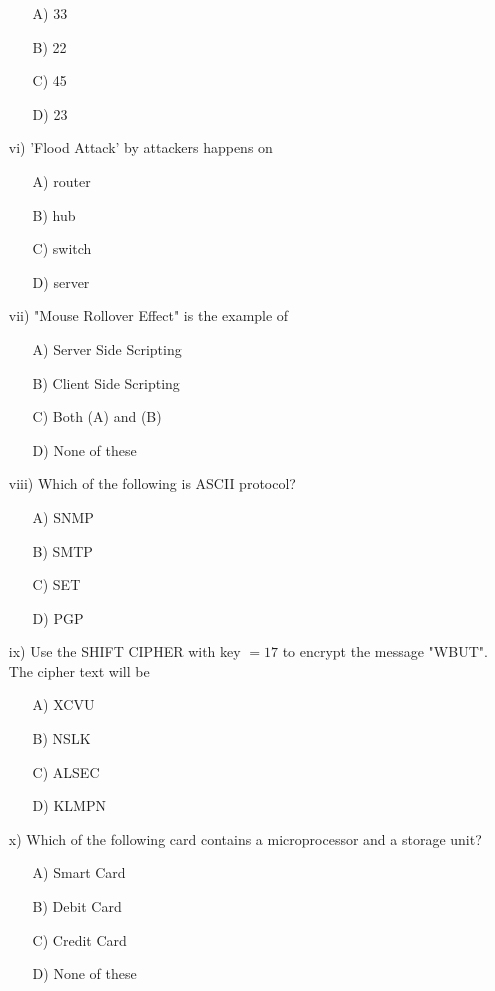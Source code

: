 \documentclass{article}
\begin{document}
\begin{enumerate}
    \begin{enumerate}
        \item[A)] 33
        \item[B)] 22
        \item[C)] 45
        \item[D)] 23
    \end{enumerate}
    \item[vi)] 'Flood Attack' by attackers happens on
    \begin{enumerate}
        \item[A)] router
        \item[B)] hub
        \item[C)] switch
        \item[D)] server
    \end{enumerate}
    \item[vii)] "Mouse Rollover Effect" is the example of
    \begin{enumerate}
        \item[A)] Server Side Scripting
        \item[B)] Client Side Scripting
        \item[C)] Both (A) and (B)
        \item[D)] None of these
    \end{enumerate}
    \item[viii)] Which of the following is ASCII protocol?
    \begin{enumerate}
        \item[A)] SNMP
        \item[B)] SMTP
        \item[C)] SET
        \item[D)] PGP
    \end{enumerate}
    \item[ix)] Use the SHIFT CIPHER with key $=17$ to encrypt the message "WBUT". The cipher text will be
    \begin{enumerate}
        \item[A)] XCVU
        \item[B)] NSLK
        \item[C)] ALSEC
        \item[D)] KLMPN
    \end{enumerate}
    \item[x)] Which of the following card contains a microprocessor and a storage unit?
    \begin{enumerate}
        \item[A)] Smart Card
        \item[B)] Debit Card
        \item[C)] Credit Card
        \item[D)] None of these
    \end{enumerate}
\end{enumerate}
\end{document}
